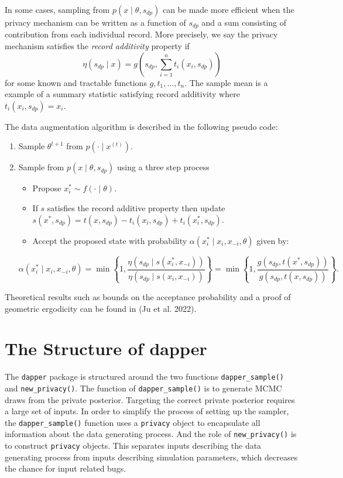 In some cases, sampling from \(p(x \mid \theta, s_{dp})\) can be made more efficient
when the privacy mechanism can be written as a function of \(s_{dp}\) and
a sum consisting of contribution from each individual record. More precisely, we say the privacy mechanism satisfies
the \emph{record additivity} property if
\[
\eta(s_{dp} \mid x) = g\left(s_{dp}, \sum_{i=1}^{n}t_i(x_i, s_{dp}) \right)
\]
for some known and tractable functions \(g, t_1, \ldots, t_n\). The sample mean is a
example of a summary statistic satisfying record additivity where \(t_i(x_i, s_{dp}) = x_i\).

The data augmentation algorithm is described in the following pseudo code:

\begin{enumerate}
\def\labelenumi{\arabic{enumi}.}
\tightlist
\item
  Sample \(\theta^{t+1}\) from \(p(\cdot \mid x^{(t)})\).
\item
  Sample from \(p(x \mid \theta, s_{dp})\) using a three step process

  \begin{itemize}
  \tightlist
  \item
    Propose \(x_{i}^{*} \sim f(\cdot \mid \theta)\).
  \item
    If \(s\) satisfies the record additive property then
    update \(s(x^*, s_{dp}) = t(x,s_{dp}) - t_i(x_i,s_{dp}) + t_{i}(x_i^*, s_{dp})\).
  \item
    Accept the proposed state with probability \(\alpha(x_i^* \mid x_i, x_{-i}, \theta)\)
    given by:
  \end{itemize}

  \[
     \alpha(x_i^* \mid x_i, x_{-i}, \theta) = \min \left\{ 1, \dfrac{\eta(s_{dp} \mid s(x_i^*, x_{-i}))}{\eta(s_{dp} \mid s(x_i, x_{-i}))} \right\}  
     = \min \left\{ 1, \dfrac{g(s_{dp}, t(x^*, s_{dp}))}{g(s_{dp}, t(x,s_{dp}))} \right\}.
   \]
\end{enumerate}

Theoretical results such as bounds on the acceptance probability and a proof
of geometric ergodicity can be found in (Ju et al. 2022).

\hypertarget{the-structure-of-dapper}{%
\section{The Structure of dapper}\label{the-structure-of-dapper}}

The \texttt{dapper} package is structured around the two functions \texttt{dapper\_sample()} and
\texttt{new\_privacy()}. The function of \texttt{dapper\_sample()} is to generate MCMC draws from
the private posterior. Targeting the correct private posterior requires
a large set of inputs. In order to simplify the process of setting up the
sampler, the \texttt{dapper\_sample()} function uses a \texttt{privacy} object to encapsulate
all information about the data generating process. And the role of \texttt{new\_privacy()} is to
construct \texttt{privacy} objects. This separates inputs describing the data generating
process from inputs describing simulation parameters, which decreases
the chance for input related bugs.

